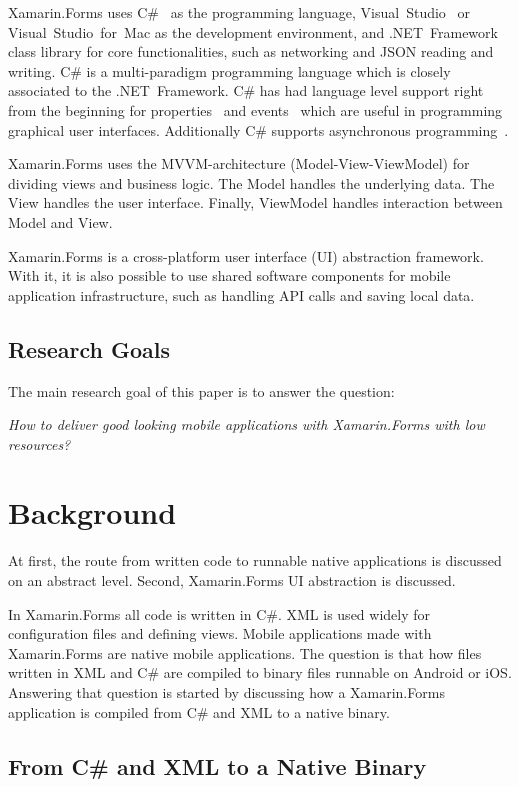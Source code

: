 \documentclass[conference]{IEEEtran}
\begin{document}
Xamarin.Forms uses C\#~\cite{csharp} as the programming language, Visual~Studio~\cite{vs} or Visual~Studio~for~Mac as the development environment, and .NET~Framework class library for core functionalities, such as networking and JSON reading and writing. C\# is a multi-paradigm programming language which is closely associated to the .NET~Framework. C\# has had language level support right from the beginning for properties~\cite{properties} and events~\cite{events} which are useful in programming graphical user interfaces. Additionally C\# supports asynchronous programming~\cite{asyncro}.

Xamarin.Forms uses the MVVM-architecture (Model-View-ViewModel) for dividing views and business logic. The Model handles the underlying data. The View handles the user interface. Finally, ViewModel handles interaction between Model and View.

Xamarin.Forms is a cross-platform user interface (UI) abstraction framework. With it, it is also possible to use shared software components for mobile application infrastructure, such as handling API calls and saving local data.

\subsection*{Research Goals}

The main research goal of this paper is to answer the question:

\emph{How to deliver good looking mobile applications with Xamarin.Forms with low resources?}

\section{Background}

At first, the route from written code to runnable native applications is discussed on an abstract level. Second, Xamarin.Forms UI abstraction is discussed.

In Xamarin.Forms all code is written in C\#. XML is used widely for configuration files and defining views. Mobile applications made with Xamarin.Forms are native mobile applications. The question is that how files written in XML and C\# are compiled to binary files runnable on Android or iOS. Answering that question is started by discussing how a Xamarin.Forms application is compiled from C\# and XML to a native binary.

\subsection{From C\# and XML to a Native Binary}
\end{document}

